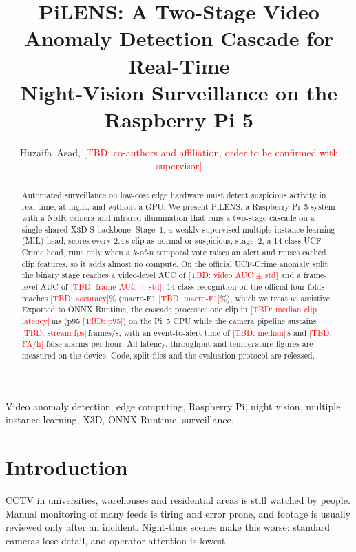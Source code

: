 \documentclass[journal]{IEEEtran}
\newcommand{\TBD}[1]{\textcolor{red}{[TBD: #1]}}
\begin{document}
\title{PiLENS: A Two-Stage Video Anomaly Detection Cascade for Real-Time\\
Night-Vision Surveillance on the Raspberry Pi 5}

\author{Huzaifa~Asad, \TBD{co-authors and affiliation, order to be confirmed with supervisor}}

\maketitle

\begin{abstract}
Automated surveillance on low-cost edge hardware must detect suspicious activity in real time,
at night, and without a GPU. We present PiLENS, a Raspberry Pi~5 system with a NoIR camera and
infrared illumination that runs a two-stage cascade on a single shared X3D-S backbone. Stage~1,
a weakly supervised multiple-instance-learning (MIL) head, scores every 2.4\,s clip as normal
or suspicious; stage~2, a 14-class UCF-Crime head, runs only when a $k$-of-$n$ temporal vote
raises an alert and reuses cached clip features, so it adds almost no compute. On the official
UCF-Crime anomaly split the binary stage reaches a video-level AUC of \TBD{video AUC $\pm$ std}
and a frame-level AUC of \TBD{frame AUC $\pm$ std}; 14-class recognition on the official four
folds reaches \TBD{accuracy}\% (macro-F1 \TBD{macro-F1}\%), which we treat as assistive. Exported
to ONNX Runtime, the cascade processes one clip in \TBD{median clip latency}\,ms (p95
\TBD{p95}) on the Pi~5 CPU while the camera pipeline sustains \TBD{stream fps}\,frames/s, with
an event-to-alert time of \TBD{median}\,s and \TBD{FA/h} false alarms per hour. All latency,
throughput and temperature figures are measured on the device. Code, split files and the
evaluation protocol are released.
\end{abstract}

\begin{IEEEkeywords}
Video anomaly detection, edge computing, Raspberry Pi, night vision, multiple instance
learning, X3D, ONNX Runtime, surveillance.
\end{IEEEkeywords}

\section{Introduction}
CCTV in universities, warehouses and residential areas is still watched by people. Manual
monitoring of many feeds is tiring and error prone, and footage is usually reviewed only after
an incident. Night-time scenes make this worse: standard cameras lose detail, and operator
attention is lowest.
\end{document}
